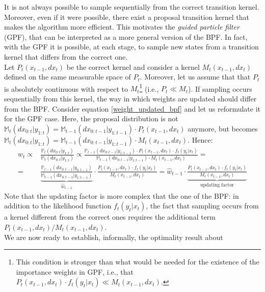 \documentclass[
]{book}
\theoremstyle{break}
\theoremstyle{nonumberplain}
\begin{document}
It is not always possible to sample sequentially from the correct
transition kernel. Moreover, even if it were possible, there exist a
proposal transition kernel that makes the algorithm more efficient. This
motivates the \textit{guided particle filter} (GPF), that can be
interpreted as a more general version of the BPF. In fact, with the GPF
it is possible, at each stage, to sample new states from a transition
kernel that differs from the correct one.~\\
Let \(P_t(x_{t-1},dx_t)\) be the correct kernel and consider a kernel
\(M_t(x_{t-1},dx_t)\) defined on the same measurable space of \(P_t\).
Moreover, let us assume that that \(P_t\) is absolutely continuous with
respect to
\(M_t\)\footnote{This condition is stronger than what would be needed for the existence of the importance weights in GPF, i.e., that  $P_t(x_{t-1},dx_t)\cdot f_t(y_t|x_t)\ll M_t(x_{t-1},dx_t)$. }
(i.e., \(P_t\ll M_t\)). If sampling occurs sequentially from this
kernel, the way in which weights are updated should differ from the BPF.
Consider equation \eqref{weight_updated_bpf} and let us reformulate it
for the GPF case. Here, the proposal distribution is not
\(\mathbb M_t(dx_{0:t}|y_{1:t})=\mathbb M_{t-1}(dx_{0:t-1}|y_{1:t-1})\cdot P_t(x_{t-1},dx_t)\)
anymore, but becomes
\(\mathbb M_t(dx_{0:t}|y_{1:t})=\mathbb M_{t-1}(dx_{0:t-1}|y_{1:t-1})\cdot M_t(x_{t-1},dx_t)\).
Hence: \begin{equation}
    \begin{split}
        w_t\propto&\frac{\mathbb P_t(dx_{0:t}|y_{1:t})}{\mathbb M_t(dx_{0:t}|y_{1:t})}\propto \frac{\mathbb P_{t-1}(dx_{0:t-1}|y_{1:t-1})\cdot P_t(x_{t-1},dx_t)\cdot f_t(y_t|x_t)}{\mathbb M_{t-1}(dx_{0:t-1}|y_{1:t-1})\cdot M_t(x_{t-1},dx_t)}=\\
        =&\underbrace{\frac{\mathbb P_{t-1}(dx_{0:t-1}|y_{0:t-1})}{\mathbb M_{t-1}(dx_{0:t-1}|y_{1:t-1})}}_{\hat w_{t-1}}\cdot\frac{P_t(x_{t-1},dx_t)\cdot f_t(y_t|x_t)}{ M_t(x_{t-1},dx_t)} =\hat w_{t-1}\cdot\underbrace{\frac{P_t(x_{t-1},dx_t)\cdot f_t(y_t|x_t)}{ M_t(x_{t-1},dx_t)}}_{\text{updating factor}}
    \end{split}\label{weight_updated_gpf}
\end{equation} Note that the updating factor is more complex that the
one of the BPF: in addition to the likelihood function \(f_t(y_t|x_t)\),
the fact that sampling occurs from a kernel different from the correct
ones requires the additional term
\(P_t(x_{t-1},dx_t)/M_t(x_{t-1},dx_t)\).~\\
We are now ready to establish, informally, the optimality result about
\end{document}
